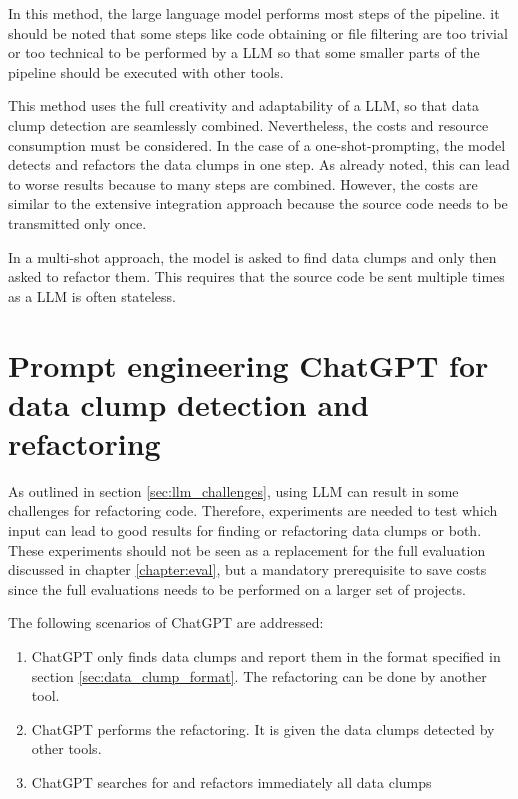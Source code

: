 In this method, the large language model performs most steps of the pipeline. it should be noted that some steps like code obtaining or file filtering are too trivial or too technical to be performed by a \ac{LLM} so that some smaller parts of the pipeline should be executed with other tools. 

This method uses the full creativity and adaptability of a \ac{LLM}, so that data clump detection are seamlessly combined. Nevertheless, the costs and resource consumption must be considered. In the case of a one-shot-prompting, the model detects and refactors the data clumps in one step. As already noted, this can lead to worse results because to many steps are combined. However, the costs are similar to the  extensive integration approach because the source code needs to be transmitted only once. 

In a multi-shot approach, the model is asked to find data clumps and only then asked to refactor them. This requires that the source code be sent multiple times as a \ac{LLM} is often stateless. 

\section{Prompt engineering ChatGPT for data clump detection and refactoring}\label{sec:prompt_engineering_impl}

As outlined in  section \ref{sec:llm_challenges}, using \ac{LLM} can result in some challenges for refactoring code. Therefore, experiments are needed to test which input can lead to good results for finding or refactoring data clumps or both. These experiments should not be seen as a replacement for the full evaluation discussed in chapter \ref{chapter:eval}, but a mandatory prerequisite to save costs since the full evaluations needs to be performed on a larger set of projects.

The following scenarios of ChatGPT are addressed:
\begin{enumerate}
    \item ChatGPT only finds data clumps and report them in the format specified in section \ref{sec:data_clump_format}. The refactoring can be done by another tool.
    \item ChatGPT performs the refactoring. It is given the data clumps detected by other tools. 
    \item ChatGPT searches for and refactors immediately all data clumps
\end{enumerate}

